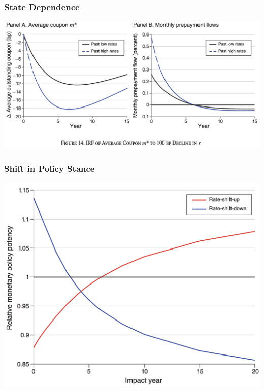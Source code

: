 \documentclass[english,xcolor=svgnames]{beamer}
\begin{document}
\begin{frame}
    \frametitle{State Dependence}
    \begin{center}
    	\includegraphics[scale=0.3]{figures/BMTVFIG13.png}	
    \end{center}
\end{frame}

\begin{frame}
    \frametitle{Shift in Policy Stance}
    \begin{center}
    	\includegraphics[scale=0.3]{figures/BMTVFIG14.png}	
    \end{center}
\end{frame}
\end{document}
